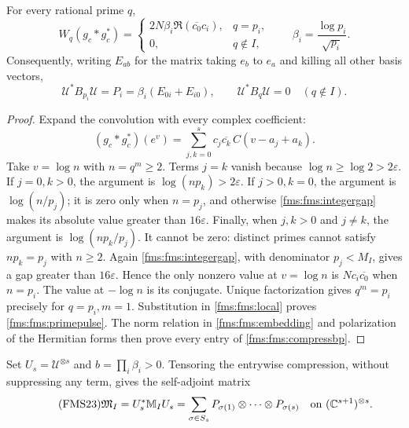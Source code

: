 \begin{proposition}
\label{fms:fms:compression}
For every rational prime $q$,
\begin{equation}\tag{FMS21}\label{fms:fms:primepulse}
 W_q(g_c*g_c^*)=
 \begin{cases}
 2N\beta_i\Re(\overline{c_0}c_i),&q=p_i,\\
 0,&q\notin I,
 \end{cases}
 \qquad \beta_i=\dfrac{\log p_i}{\sqrt{p_i}}.
\end{equation}
Consequently, writing $E_{ab}$ for the matrix taking $e_b$ to
$e_a$ and killing all other basis vectors,
\begin{equation}\tag{FMS22}\label{fms:fms:compressbp}
 \mathcal U^*B_{p_i}\mathcal U=P_i
       =\beta_i(E_{0i}+E_{i0}),\qquad
 \mathcal U^*B_q\mathcal U=0\quad(q\notin I).
\end{equation}
\end{proposition}
\begin{proof}
Expand the convolution with every complex coefficient:
\[
 (g_c*g_c^*)(e^v)=
 \sum_{j,k=0}^s c_j\overline{c_k}\,
                  C(v-a_j+a_k).
\]
Take $v=\log n$ with $n=q^m\ge2$. Terms $j=k$ vanish because
$\log n\ge\log2>2\varepsilon$. If $j=0,k>0$, the argument is
$\log(np_k)>2\varepsilon$. If $j>0,k=0$, the argument is
$\log(n/p_j)$; it is zero only when $n=p_j$, and otherwise
\eqref{fms:fms:integergap} makes its absolute value greater than
$16\varepsilon$. Finally, when $j,k>0$ and $j\ne k$, the
argument is $\log(np_k/p_j)$. It cannot be zero: distinct primes
cannot satisfy $np_k=p_j$ with $n\ge2$. Again
\eqref{fms:fms:integergap}, with denominator $p_j<M_I$, gives a
gap greater than $16\varepsilon$. Hence the only nonzero value
at $v=\log n$ is $Nc_i\overline{c_0}$ when $n=p_i$.
The value at $-\log n$ is its conjugate. Unique factorization
gives $q^m=p_i$ precisely for $q=p_i,m=1$.
Substitution in \eqref{fms:fms:local} proves
\eqref{fms:fms:primepulse}. The norm relation in
\eqref{fms:fms:embedding} and polarization of the Hermitian forms
then prove every entry of \eqref{fms:fms:compressbp}.
\end{proof}

Set $U_s=\mathcal U^{\otimes s}$ and $b=\prod_i\beta_i>0$.
Tensoring the entrywise compression, without suppressing any term,
gives the self-adjoint matrix
\begin{equation}\tag{FMS23}\label{fms:fms:finitemixed}
 \mathfrak M_I=U_s^*\mathbb M_IU_s
       =\sum_{\sigma\in S_s}
          P_{\sigma(1)}\otimes\cdots\otimes P_{\sigma(s)}
 \quad\hbox{on }(\mathbb C^{s+1})^{\otimes s}.
\end{equation}

